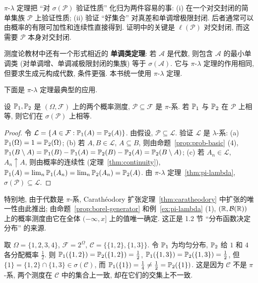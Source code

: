 \begin{intuition}
$\pi$-$\lambda$ 定理把 ``对 $\sigma(\mathcal{P})$ 验证性质'' 化归为两件容易的事: (i) 在一个对交封闭的简单集族 $\mathcal{P}$ 上验证性质; (ii) 验证 ``好集合'' 对真差和单调增极限封闭. 后者通常可以由概率的有限可加性和连续性直接得到. 证明中的关键是 $\ell(\mathcal{P})$ 对交封闭, 而这需要 $\mathcal{P}$ 本身对交封闭.
\end{intuition}

\begin{remark}
测度论教材中还有一个形式相近的 \textbf{单调类定理}: 若 $\mathcal{A}$ 是代数, 则包含 $\mathcal{A}$ 的最小单调类 (对单调增、单调减极限封闭的集族) 等于 $\sigma(\mathcal{A})$. 它与 $\pi$-$\lambda$ 定理的作用相同, 但要求生成元构成代数, 条件更强. 本书统一使用 $\pi$-$\lambda$ 定理.
\end{remark}

下面是 $\pi$-$\lambda$ 定理最典型的应用.

\begin{corollary}[概率测度的唯一性]\label{cor:uniqueness}
设 $\P_1,\P_2$ 是 $(\Omega,\mathcal{F})$ 上的两个概率测度, $\mathcal{P}\subseteq\mathcal{F}$ 是 $\pi$-系. 若 $\P_1$ 与 $\P_2$ 在 $\mathcal{P}$ 上相等, 则它们在 $\sigma(\mathcal{P})$ 上相等.
\end{corollary}

\begin{proof}
令 $\mathcal{L}=\{A\in\mathcal{F}: \P_1(A)=\P_2(A)\}$. 由假设, $\mathcal{P}\subseteq\mathcal{L}$. 验证 $\mathcal{L}$ 是 $\lambda$-系:
(a) $\P_1(\Omega)=1=\P_2(\Omega)$;
(b) 若 $A,B\in\mathcal{L}$, $A\subseteq B$, 则由命题~\ref{prop:prob-basic} (4), $\P_1(B\setminus A)=\P_1(B)-\P_1(A)=\P_2(B)-\P_2(A)=\P_2(B\setminus A)$;
(c) 若 $A_n\in\mathcal{L}$, $A_n\uparrow A$, 则由概率的连续性 (定理~\ref{thm:continuity}), $\P_1(A)=\lim_n\P_1(A_n)=\lim_n\P_2(A_n)=\P_2(A)$.
由 $\pi$-$\lambda$ 定理~\ref{thm:pi-lambda}, $\sigma(\mathcal{P})\subseteq\mathcal{L}$.
\end{proof}

特别地, 由于代数是 $\pi$-系, Carath\'eodory 扩张定理~\ref{thm:caratheodory} 中扩张的唯一性由此推出; 由命题~\ref{prop:borel-generator} 和例~\ref{ex:pi-lambda} (1), $(\R,\mathcal{B}(\R))$ 上的概率测度由它在全体 $(-\infty,x]$ 上的值唯一确定. 这正是 1.2 节 ``分布函数决定分布'' 的来源.

\begin{example}[$\pi$-系条件不可去掉]
取 $\Omega=\{1,2,3,4\}$, $\mathcal{F}=2^\Omega$, $\mathcal{C}=\{\{1,2\},\{1,3\}\}$. 令 $\P_1$ 为均匀分布, $\P_2$ 给 $1$ 和 $4$ 各分配概率 $\frac{1}{2}$. 则
$\P_1(\{1,2\})=\P_2(\{1,2\})=\frac{1}{2}$, $\P_1(\{1,3\})=\P_2(\{1,3\})=\frac{1}{2}$, 但 $\{1\}=\{1,2\}\cap\{1,3\}\in\sigma(\mathcal{C})$, 而 $\P_1(\{1\})=\frac{1}{4}\ne\frac{1}{2}=\P_2(\{1\})$. 这是因为 $\mathcal{C}$ 不是 $\pi$-系, 两个测度在 $\mathcal{C}$ 中的集合上一致, 却在它们的交集上不一致.
\end{example}


